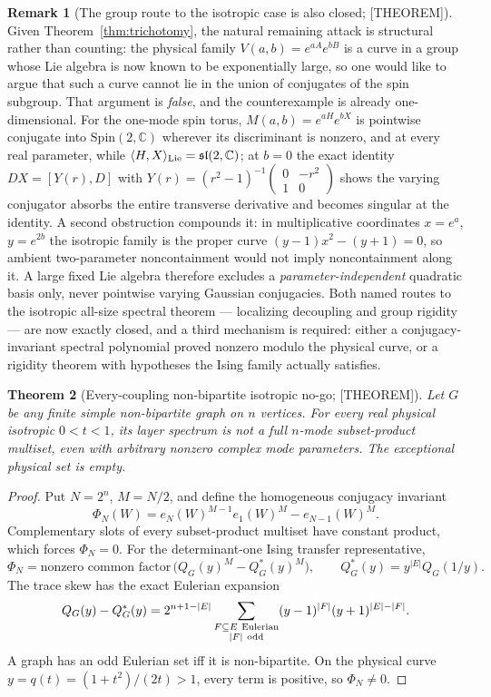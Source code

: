 \documentclass[11pt]{article}
\newtheorem{theorem}{Theorem}[section]
\theoremstyle{definition}
\newtheorem{remark}[theorem]{Remark}
\newcommand{\Cb}{\mathbb{C}}
\begin{document}
\begin{remark}[The group route to the isotropic case is also closed; {[THEOREM]}]
Given Theorem~\ref{thm:trichotomy}, the natural remaining attack is structural rather than
counting: the physical family $V(a,b)=e^{aA}e^{bB}$ is a curve in a group whose Lie algebra is now
known to be exponentially large, so one would like to argue that such a curve cannot lie in the union
of conjugates of the spin subgroup. That argument is \emph{false}, and the counterexample is already
one-dimensional. For the one-mode spin torus, $M(a,b)=e^{aH}e^{bX}$ is pointwise conjugate into
$\mathrm{Spin}(2,\Cb)$ wherever its discriminant is nonzero, and at every real parameter, while
$\langle H,X\rangle_{\rm Lie}=\mathfrak{sl}(2,\Cb)$; at $b=0$ the exact identity $DX=[Y(r),D]$ with
$Y(r)=(r^2-1)^{-1}\left(\begin{smallmatrix}0&-r^2\\1&0\end{smallmatrix}\right)$ shows the
varying conjugator absorbs the entire transverse derivative and becomes singular at the identity. A
second obstruction compounds it: in multiplicative coordinates $x=e^{a}$, $y=e^{2b}$ the isotropic
family is the proper curve $(y-1)x^2-(y+1)=0$, so ambient two-parameter noncontainment would not
imply noncontainment along it. A large fixed Lie algebra therefore excludes a
\emph{parameter-independent} quadratic basis only, never pointwise varying Gaussian conjugacies. Both
named routes to the isotropic all-size spectral theorem --- localizing decoupling and group rigidity
--- are now exactly closed, and a third mechanism is required: either a conjugacy-invariant spectral
polynomial proved nonzero modulo the physical curve, or a rigidity theorem with hypotheses the Ising
family actually satisfies.
\end{remark}

\begin{theorem}[Every-coupling non-bipartite isotropic no-go; {[THEOREM]}]\label{thm:isotrace}
Let $G$ be any finite simple non-bipartite graph on $n$ vertices. For every real physical isotropic
$0<t<1$, its layer spectrum is not a full $n$-mode subset-product multiset, even with arbitrary
nonzero complex mode parameters. The exceptional physical set is empty.
\end{theorem}

\begin{proof}
Put $N=2^n$, $M=N/2$, and define the homogeneous conjugacy invariant
\[
\Phi_N(W)=e_N(W)^{M-1}e_1(W)^M-e_{N-1}(W)^M.
\]
Complementary slots of every subset-product multiset have constant product, which forces
$\Phi_N=0$. For the determinant-one Ising transfer representative,
\[
\Phi_N=\text{nonzero common factor}\,
\bigl(Q_G(y)^M-Q_G^*(y)^M\bigr),\qquad Q_G^*(y)=y^{|E|}Q_G(1/y).
\]
The trace skew has the exact Eulerian expansion
\[
Q_G(y)-Q_G^*(y)=2^{n+1-|E|}
\sum_{\substack{F\subseteq E\ {\rm Eulerian}\\ |F|\ {\rm odd}}}
(y-1)^{|F|}(y+1)^{|E|-|F|}.
\]
A graph has an odd Eulerian set iff it is non-bipartite. On the physical curve
$y=q(t)=(1+t^2)/(2t)>1$, every term is positive, so $\Phi_N\ne0$.
\end{proof}
\end{document}
